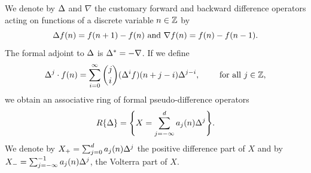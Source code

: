 \documentclass[11pt,reqno]{amsart}
\theoremstyle{definition}
\numberwithin{equation}{section}
\begin{document}
We denote by $\Delta$ and $\nabla$ the customary forward and backward difference 
operators acting on functions of a discrete variable $n\in\mathbb Z$ by
\begin{equation*}
\Delta f(n) = f(n+1)-f(n) \text{ and }\nabla f(n)=f(n)-f(n-1).
\end{equation*}
The formal adjoint to $\Delta$ is $\Delta^*=-\nabla$. If we define
\begin{equation*}
\Delta^j\cdot f(n)=\sum_{i=0}^{\infty}\binom{j}{i}(\Delta^if)(n+j-i)\Delta^{j-i},
\qquad \text{ for all }j\in\mathbb Z,
\end{equation*}
we obtain an associative ring of formal pseudo-difference operators
\begin{equation*}
R\{\Delta\}=\Bigg\{X=\sum_{j=-\infty}^da_j(n)\Delta^j\Bigg\}.
\end{equation*}
We denote by $X_+=\sum_{j=0}^da_j(n)\Delta^j$ the positive difference 
part of $X$ and by $X_-=\sum_{j=-\infty}^{-1}a_j(n)\Delta^j$, the Volterra 
part of $X$. 
\end{document}
